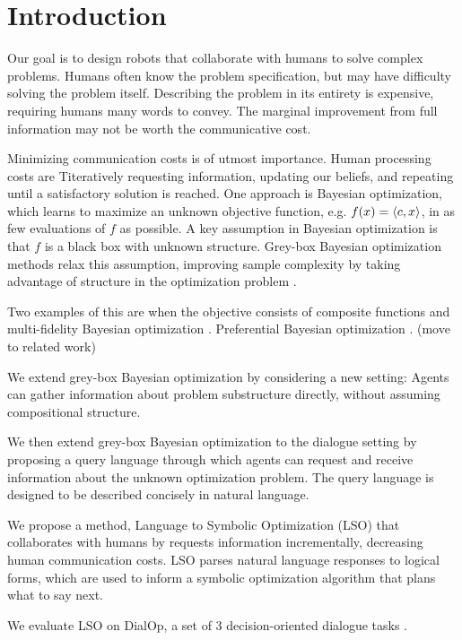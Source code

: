 \documentclass{article}
\theoremstyle{plain}
\theoremstyle{definition}
\theoremstyle{remark}
\begin{document}
\section{Introduction}

Our goal is to design robots that collaborate with humans to solve complex problems.
Humans often know the problem specification, but may have difficulty solving the problem itself.
Describing the problem in its entirety is expensive, requiring humans many words to convey.
The marginal improvement from full information may not be worth the communicative cost.

Minimizing communication costs is of utmost importance.
Human processing costs are 
Titeratively requesting information, updating our beliefs, and repeating until a satisfactory solution is reached.
One approach is Bayesian optimization, which learns to maximize an unknown objective function,
e.g. $f(x) = \left\langle c,x\right\rangle$, in as few evaluations of $f$ as possible.
A key assumption in Bayesian optimization is that $f$ is a black box with unknown structure.
Grey-box Bayesian optimization methods relax this assumption, improving sample complexity by taking advantage of structure in the optimization problem \citep{grey-box-bayesopt}.

Two examples of this are when the objective consists of composite functions \citep{astudillo2019bayesian} and multi-fidelity Bayesian optimization \citep{poloczek2016multiinformation,Zanjani_Foumani_2023}. 
Preferential Bayesian optimization \citep{astudillo2023qeubo}. (move to related work)

We extend grey-box Bayesian optimization by considering a new setting:
Agents can gather information about problem substructure directly, without assuming compositional structure.

We then extend grey-box Bayesian optimization to the dialogue setting by proposing a query language through which agents can request and receive information about the unknown optimization problem.
The query language is designed to be described concisely in natural language.

We propose a method, Language to Symbolic Optimization (LSO) that collaborates with humans by requests information incrementally, decreasing human communication costs.
LSO parses natural language responses to logical forms, which are used to inform a symbolic optimization algorithm that plans what to say next.

We evaluate LSO on DialOp, a set of 3 decision-oriented dialogue tasks \citep{lin2023decision}.
\end{document}
